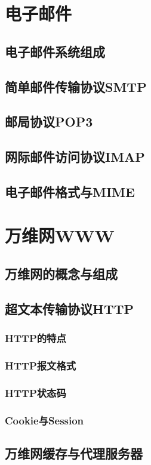 \documentclass[lang=cn,newtx,10pt,scheme=chinese]{../../elegantbook}
\begin{document}
\section{电子邮件}
\subsection{电子邮件系统组成}
\subsection{简单邮件传输协议SMTP}
\subsection{邮局协议POP3}
\subsection{网际邮件访问协议IMAP}
\subsection{电子邮件格式与MIME}

\section{万维网WWW}
\subsection{万维网的概念与组成}
\subsection{超文本传输协议HTTP}
\subsubsection{HTTP的特点}
\subsubsection{HTTP报文格式}
\subsubsection{HTTP状态码}
\subsubsection{Cookie与Session}
\subsection{万维网缓存与代理服务器}
\end{document}
